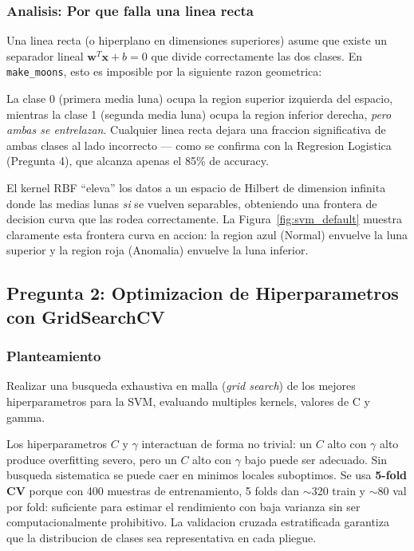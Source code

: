 \documentclass[12pt,a4paper]{article}
\begin{document}
\subsubsection*{Analisis: Por que falla una linea recta}

Una linea recta (o hiperplano en dimensiones superiores) asume que existe un separador lineal
$\mathbf{w}^T\mathbf{x} + b = 0$ que divide correctamente las dos clases. En
\texttt{make\_moons}, esto es imposible por la siguiente razon geometrica:

La clase 0 (primera media luna) ocupa la region superior izquierda del espacio, mientras la
clase 1 (segunda media luna) ocupa la region inferior derecha, \textit{pero ambas se entrelazan}.
Cualquier linea recta dejara una fraccion significativa de ambas clases al lado incorrecto ---
como se confirma con la Regresion Logistica (Pregunta 4), que alcanza apenas el 85\% de accuracy.

El kernel RBF ``eleva'' los datos a un espacio de Hilbert de dimension infinita donde las medias
lunas \textit{si} se vuelven separables, obteniendo una frontera de decision curva que las rodea
correctamente. La Figura~\ref{fig:svm_default} muestra claramente esta frontera curva en
accion: la region azul (Normal) envuelve la luna superior y la region roja (Anomalia) envuelve
la luna inferior.

\subsection{Pregunta 2: Optimizacion de Hiperparametros con GridSearchCV}

\subsubsection*{Planteamiento}
Realizar una busqueda exhaustiva en malla (\textit{grid search}) de los mejores hiperparametros
para la SVM, evaluando multiples kernels, valores de C y gamma.

\begin{tcolorbox}[porquebox, title={Por que GridSearchCV con 5-fold CV?}]
Los hiperparametros $C$ y $\gamma$ interactuan de forma no trivial: un $C$ alto con $\gamma$
alto produce overfitting severo, pero un $C$ alto con $\gamma$ bajo puede ser adecuado. Sin
busqueda sistematica se puede caer en minimos locales suboptimos. Se usa \textbf{5-fold CV}
porque con 400 muestras de entrenamiento, 5 folds dan $\sim$320 train y $\sim$80 val por fold:
suficiente para estimar el rendimiento con baja varianza sin ser computacionalmente prohibitivo.
La validacion cruzada estratificada garantiza que la distribucion de clases sea representativa
en cada pliegue.
\end{tcolorbox}
\end{document}
